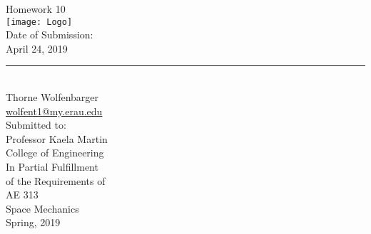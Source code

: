 \begin{center}
  {\huge Homework 10}\\
  \vspace{10px}
  \texttt{[image: Logo]} \\
  Date of Submission:\\
  April 24, 2019\\
  \vspace{30px}
  \rule{300px}{0.5px} \\
  Thorne Wolfenbarger \\
  \href{mailto:wolfent1@my.erau.edu}{wolfent1@my.erau.edu} \\
  \vspace{30px}
  Submitted to: \\
  Professor Kaela Martin \\
  College of Engineering \\
  \vspace{40px}
  In Partial Fulfillment \\
  of the Requirements of \\
  \vspace{10px}
  AE 313 \\
  Space Mechanics \\
  Spring, 2019 \\
\end{center}
